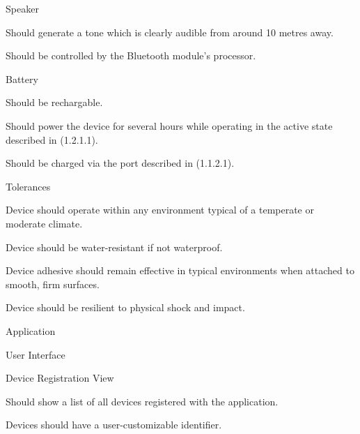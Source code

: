 \documentclass[12pt]{article}
\begin{document}
\begin{packed_enum}
\begin{packed_enum}
\begin{packed_enum}
\begin{packed_enum}
        \end{packed_enum}
        \item Speaker
        \begin{packed_enum}
          \item Should generate a tone which is clearly audible from around 10
                metres away.
          \item Should be controlled by the Bluetooth module's processor.
        \end{packed_enum}
        \item Battery
        \begin{packed_enum}
          \item Should be rechargable.
          \item Should power the device for several hours while operating in
                the active state described in (1.2.1.1).
          \item Should be charged via the port described in (1.1.2.1).
        \end{packed_enum}
      \end{packed_enum}
      \item Tolerances
      \begin{packed_enum}
        \item Device should operate within any environment typical of a
              temperate or moderate climate.
        \item Device should be water-resistant if not waterproof.
        \item Device adhesive should remain effective in typical environments
              when attached to smooth, firm surfaces.
        \item Device should be resilient to physical shock and impact.
      \end{packed_enum}
    \end{packed_enum}
    \item Application
    \begin{packed_enum}
      \item User Interface
      \begin{packed_enum}
        \item Device Registration View
        \begin{packed_enum}
          \item Should show a list of all devices registered with the
                application.
          \item Devices should have a user-customizable identifier.

\end{packed_enum}
\end{packed_enum}
\end{packed_enum}
\end{packed_enum}
\end{document}
